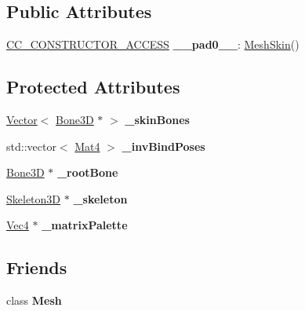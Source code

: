 \subsection*{Public Attributes}
\begin{DoxyCompactItemize}
\item 
\mbox{\label{classMeshSkin_ab5b935190603a7a93d0df1210a5ccf1b}} 
\hyperlink{_2cocos2d_2cocos_2base_2ccConfig_8h_a25ef1314f97c35a2ed3d029b0ead6da0}{C\+C\+\_\+\+C\+O\+N\+S\+T\+R\+U\+C\+T\+O\+R\+\_\+\+A\+C\+C\+E\+SS} {\bfseries \+\_\+\+\_\+pad0\+\_\+\+\_\+}\+: \hyperlink{classMeshSkin}{Mesh\+Skin}()
\end{DoxyCompactItemize}
\subsection*{Protected Attributes}
\begin{DoxyCompactItemize}
\item 
\mbox{\label{classMeshSkin_adabe1ffb32f6afcf3b47571334f9661c}} 
\hyperlink{classVector}{Vector}$<$ \hyperlink{classBone3D}{Bone3D} $\ast$ $>$ {\bfseries \+\_\+skin\+Bones}
\item 
\mbox{\label{classMeshSkin_a1d9a6d0d3bc0d41d7a45d5bd88f38d82}} 
std\+::vector$<$ \hyperlink{classMat4}{Mat4} $>$ {\bfseries \+\_\+inv\+Bind\+Poses}
\item 
\mbox{\label{classMeshSkin_a2d736d8cf08e9fb08c753d7d801a4e58}} 
\hyperlink{classBone3D}{Bone3D} $\ast$ {\bfseries \+\_\+root\+Bone}
\item 
\mbox{\label{classMeshSkin_ac737f74af96bb1ae690f9865874bf853}} 
\hyperlink{classSkeleton3D}{Skeleton3D} $\ast$ {\bfseries \+\_\+skeleton}
\item 
\mbox{\label{classMeshSkin_ad5acbd51a36caa8c35b9ec73564d8d32}} 
\hyperlink{classVec4}{Vec4} $\ast$ {\bfseries \+\_\+matrix\+Palette}
\end{DoxyCompactItemize}
\subsection*{Friends}
\begin{DoxyCompactItemize}
\item 
\mbox{\label{classMeshSkin_ac9b3996998332cf8a503b4fbcaa6b200}} 
class {\bfseries Mesh}
\end{DoxyCompactItemize}
